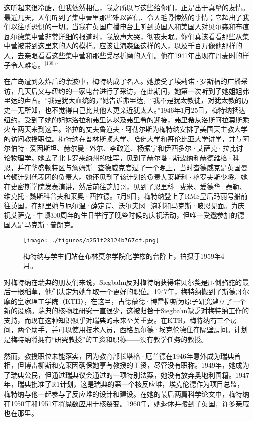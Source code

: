 这听起来很冷酷，但我依然相信，我之所以写这些给你们，正是出于真挚的友情。最近几天，人们听到了集中营里那些难以置信、令人毛骨悚然的事情；它超出了我们以往所恐惧的一切。当我在英国广播电台上听到英国人和美国人对贝尔森和布痕瓦尔德集中营非常详细的报道时，我放声大哭，彻夜未眠。你们真该看看那些从集中营被带到这里来的人的模样。应该让海森堡这样的人，以及千百万像他那样的人，去亲眼看看这些集中营和那些受尽折磨的人们。他在1941年出现在丹麦时的样子令人难忘。\(^\text{[138]}\)”

在广岛遭到轰炸后的余波中，梅特纳成了名人。她接受了埃莉诺·罗斯福的广播采访，几天后又与纽约的一家电台进行了采访，在此期间，她第一次听到了她姐姐弗里达的声音。“我是犹太血统的，”她告诉弗里达，“我不是犹太教徒，对犹太教的历史一无所知，也不觉得自己比其他人更亲近犹太人。”1946年1月25日，梅特纳抵达纽约，受到了她的姐妹洛拉和弗里达以及弗里希的迎接，弗里希从洛斯阿拉莫斯乘火车两天来到这里。洛拉的丈夫鲁道夫·阿勒尔斯为梅特纳安排了美国天主教大学的访问教授职位。梅特纳在普林斯顿大学、哈佛大学和哥伦比亚大学讲学，并与阿尔伯特·爱因斯坦、赫尔曼·外尔、李政道、杨振宁和伊西多尔·艾萨克·拉比讨论物理学。她去了北卡罗来纳州的杜罕，见到了赫尔塔·斯波纳和赫德维格·科恩，并在华盛顿特区与詹姆斯·查德威克度过了一个晚上，当时查德威克是英国曼哈顿计划代表团的负责人。她还见到了该计划的负责人莱斯利·格罗夫斯少将。她在史密斯学院发表演讲，然后前往芝加哥，见到了恩里科·费米、爱德华·泰勒、维克托·魏斯科普夫和莱奥·西拉德。7月8日，梅特纳登上了RMS皇后玛丽号船前往英国，在那里她与厄尔温·薛定谔、沃尔夫冈·泡利和马克斯·玻恩见面。为庆祝艾萨克·牛顿300周年的生日举行了晚些时候的庆祝活动，但唯一受邀参加的德国人是马克斯·普朗克。
\begin{figure}[ht]
\centering
\texttt{[image: ./figures/a251f28124b767cf.png]}
\caption{梅特纳与学生们站在布林莫尔学院化学楼的台阶上，拍摄于1959年4月。} \label{fig_LZm_14}
\end{figure}
对梅特纳在瑞典的朋友们来说，Siegbahn反对梅特纳获得诺贝尔奖是压倒骆驼的最后一根稻草，他们决定为她争取一个更好的职位。1947年，梅特纳搬到了斯德哥尔摩的皇家理工学院（KTH），在这里，古德蒙德·博雷柳斯为原子研究建立了一个新的设施。瑞典的核物理研究一直很少，这被归咎于Siegbahn缺乏对梅特纳工作的支持，而现在这种知识似乎对瑞典的未来至关重要。在KTH，梅特纳有三个房间，两个助手，并可以使用技术人员，西格瓦尔德·埃克伦德住在隔壁房间。计划是梅特纳将拥有“研究教授”的工资和职称——没有教学任务的教授。

然而，教授职位未能落实，因为教育部长塔格·厄兰德在1946年意外成为瑞典首相，但博雷柳斯和克莱因确保她享有教授的工资，尽管没有职称。1949年，她成为了瑞典公民，但通过瑞典议会通过的一项特别法案，她没有放弃奥地利国籍。1947年，瑞典批准了R1计划，这是瑞典的第一个核反应堆，埃克伦德作为项目总监，梅特纳与他一起参与了反应堆的设计和建设。在她的最后两篇科学论文中，梅特纳在1950年和1951年将魔数应用于核裂变。1960年，她退休并搬到了英国，许多亲戚也在那里。

